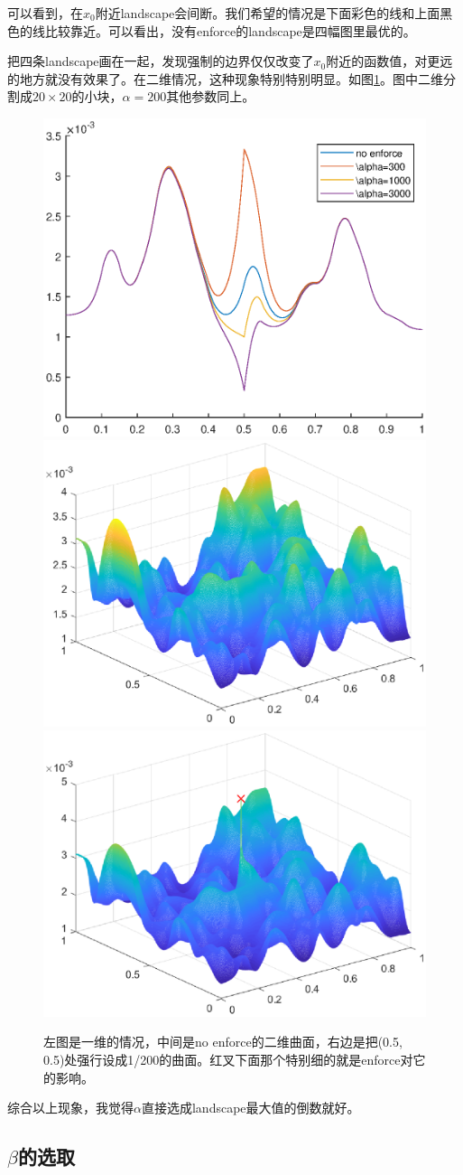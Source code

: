 \documentclass[UTF8,12pt]{article}
\begin{document}
可以看到，在$x_0$附近landscape会间断。我们希望的情况是下面彩色的线和上面黑色的线比较靠近。可以看出，没有enforce的landscape是四幅图里最优的。

把四条landscape画在一起，发现强制的边界仅仅改变了$x_0$附近的函数值，对更远的地方就没有效果了。在二维情况，这种现象特别特别明显。如图\ref{fig2}。图中二维分割成$20 \times 20$的小块，$\alpha = 200$其他参数同上。

\begin{figure}[htbp]
    \centering
    \includegraphics[width=0.3\linewidth]{pic/nouse1d}
    \includegraphics[width=0.3\linewidth]{pic/nouse2d1}
    \includegraphics[width=0.3\linewidth]{pic/nouse2d2}
    \label{fig2}
\caption{左图是一维的情况，中间是no enforce的二维曲面，右边是把(0.5, 0.5)处强行设成1/200的曲面。红叉下面那个特别细的就是enforce对它的影响。}
\end{figure}

综合以上现象，我觉得$\alpha$直接选成landscape最大值的倒数就好。

\subsection{$\beta$的选取}
\end{document}
